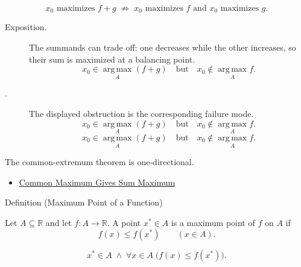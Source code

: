 \begin{remark*}
\[
  x_0\text{ maximizes }f+g
  \;\not\Longrightarrow\;
  x_0\text{ maximizes }f\text{ and }x_0\text{ maximizes }g.
\]
\end{remark*}

\begin{remark*}
\begin{description}
  \item[Exposition.]
The summands can trade off: one decreases while the other increases, so their
sum is maximized at a balancing point.
\[
  x_0\in\operatorname*{arg\,max}_A(f+g)
  \quad\text{but}\quad
  x_0\notin\operatorname*{arg\,max}_A f.
\]


  \item[\exists{}.]
  The displayed obstruction is the corresponding failure mode.
  \[
  x_0\in\operatorname*{arg\,max}_A(f+g)
  \quad\text{but}\quad
  x_0\notin\operatorname*{arg\,max}_A f.
\]
  \[
  x_0\in\operatorname*{arg\,max}_A(f+g)
  \quad\text{but}\quad
  x_0\notin\operatorname*{arg\,max}_A f.
\]
\end{description}
\end{remark*}

\begin{remark*}[Interpretation]
The common-extremum theorem is one-directional.
\end{remark*}

\begin{dependencies}
\begin{itemize}
  \item \hyperref[thm:common-maximum-gives-sum-maximum]{Common Maximum Gives Sum Maximum}
\end{itemize}
\end{dependencies}

\begin{definitionbox}{Definition (Maximum Point of a Function)}
\begin{definition}
\label{def:function-maximum-point}
Let $A\subseteq\mathbb{R}$ and let $f:A\to\mathbb{R}$.  A point
$x^*\in A$ is a maximum point of $f$ on $A$ if
\[
  f(x)\leq f(x^*)
  \qquad (x\in A).
\]
\end{definition}
\end{definitionbox}

\begin{remark*}
\[
  x^*\in A\;\wedge\;\forall x\in A\;\bigl(f(x)\leq f(x^*)\bigr).
\]
\end{remark*}

